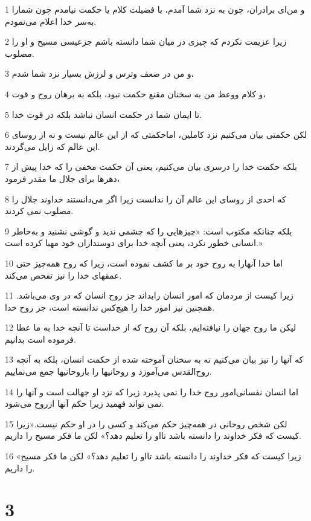 \par 1 و من‌ای برادران، چون به نزد شما آمدم، با فضیلت کلام یا حکمت نیامدم چون شمارا به‌سر خدا اعلام می‌نمودم.
\par 2 زیرا عزیمت نکردم که چیزی در میان شما دانسته باشم جزعیسی مسیح و او را مصلوب.
\par 3 و من در ضعف وترس و لرزش بسیار نزد شما شدم،
\par 4 و کلام ووعظ من به سخنان مقنع حکمت نبود، بلکه به برهان روح و قوت،
\par 5 تا ایمان شما در حکمت انسان نباشد بلکه در قوت خدا.
\par 6 لکن حکمتی بیان می‌کنیم نزد کاملین، اماحکمتی که از این عالم نیست و نه از روسای این عالم که زایل می‌گردند.
\par 7 بلکه حکمت خدا را درسری بیان می‌کنیم، یعنی آن حکمت مخفی را که خدا پیش از دهرها برای جلال ما مقدر فرمود،
\par 8 که احدی از روسای این عالم آن را ندانست زیرا اگر می‌دانستند خداوند جلال را مصلوب نمی کردند.
\par 9 بلکه چنانکه مکتوب است: «چیزهایی را که چشمی ندید و گوشی نشنید و به‌خاطر انسانی خطور نکرد، یعنی آنچه خدا برای دوستداران خود مهیا کرده است.»
\par 10 اما خدا آنهارا به روح خود بر ما کشف نموده است، زیرا که روح همه‌چیز حتی عمقهای خدا را نیز تفحص می‌کند.
\par 11 زیرا کیست از مردمان که امور انسان رابداند جز روح انسان که در وی می‌باشد. همچنین نیز امور خدا را هیچ‌کس ندانسته است، جز روح خدا.
\par 12 لیکن ما روح جهان را نیافته‌ایم، بلکه آن روح که از خداست تا آنچه خدا به ما عطا فرموده است بدانیم.
\par 13 که آنها را نیز بیان می‌کنیم نه به سخنان آموخته شده از حکمت انسان، بلکه به آنچه روح‌القدس می‌آموزد و روحانیها را باروحانیها جمع می‌نماییم.
\par 14 اما انسان نفسانی‌امور روح خدا را نمی پذیرد زیرا که نزد او جهالت است و آنها را نمی تواند فهمید زیرا حکم آنها ازروح می‌شود.
\par 15 لکن شخص روحانی در همه‌چیز حکم می‌کند و کسی را در او حکم نیست.«زیرا کیست که فکر خداوند را دانسته باشد تااو را تعلیم دهد؟» لکن ما فکر مسیح را داریم.
\par 16 «زیرا کیست که فکر خداوند را دانسته باشد تااو را تعلیم دهد؟» لکن ما فکر مسیح را داریم.

\chapter{3}

